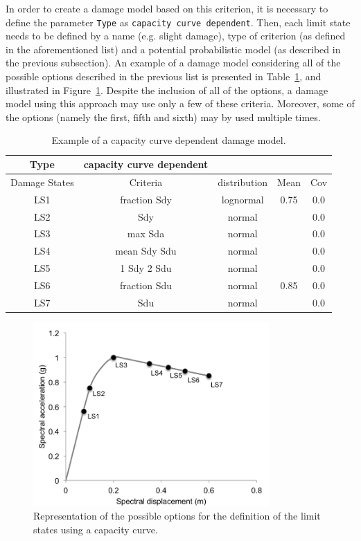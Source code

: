 In order to create a damage model based on this criterion, it is necessary to define the parameter \verb=Type= as \verb=capacity curve dependent=. Then, each limit state needs to be defined by a name (e.g. slight damage), type of criterion (as defined in the aforementioned list) and a potential probabilistic model (as described in the previous subsection). An example of a damage model considering all of the possible options described in the previous list is presented in Table~\ref{table:cc-dmg}, and illustrated in Figure~\ref{fig:cc-dmg}. Despite the inclusion of all of the options, a damage model using this approach may use only a few of these criteria. Moreover, some of the options (namely the first, fifth and sixth) may by used multiple times.

\begin {table}[!htbp]
\caption{Example of a capacity curve dependent damage model.}
\label{table:cc-dmg}
\begin{center}
  \begin{tabular}{ | c | c | c | c | c |}
  \hline
    Type & capacity curve dependent &  &  & \\ \hline
    Damage States & Criteria & distribution & Mean & Cov \\ \hline
    LS1 & fraction Sdy & lognormal & 0.75 & 0.0 \\ \hline
    LS2 & Sdy & normal &  & 0.0 \\ \hline
    LS3 & max Sda & normal &  & 0.0 \\ \hline
    LS4 & mean Sdy Sdu & normal &  & 0.0 \\ \hline
    LS5 & 1 Sdy 2 Sdu & normal &  & 0.0 \\ \hline
    LS6 & fraction Sdu & normal & 0.85 & 0.0 \\ \hline
    LS7 & Sdu & normal &  & 0.0 \\ \hline
  \end{tabular}
\end{center}
\end{table}

\begin{figure}[htb]
  \centering
      \includegraphics[width=9cm]{figures/cc_damage_model.png}
  \caption{Representation of the possible options for the definition of the limit states using a capacity curve.}
  \label{fig:cc-dmg}
\end{figure}


